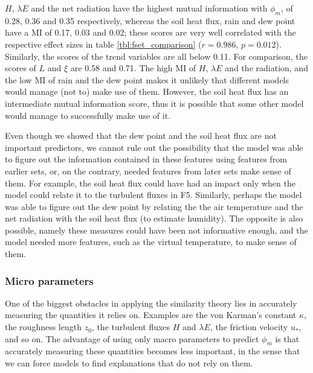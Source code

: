 \documentclass[a4paper,11pt]{kth-mag}
\begin{document}
$H$, $\lambda E$ and the net radiation have the highest mutual information with $\phi_m$, of 0.28, 0.36 and 0.35 respectively, whereas the soil heat flux, rain and dew point have a MI of 0.17, 0.03 and 0.02; these scores are very well correlated with the respective effect sizes in table \ref{tbl:fset_comparison} ($r=0.986$, $p=0.012$). Similarly, the scores of the trend variables are all below 0.11. For comparison, the scores of $L$ and $\xi$ are 0.58 and 0.71. The high MI of $H$, $\lambda E$ and the radiation, and the low MI of rain and the dew point makes it unlikely that different models would manage (not to) make use of them. However, the soil heat flux has an intermediate mutual information score, thus it is possible that some other model would manage to successfully make use of it.

Even though we showed that the dew point and the soil heat flux are not important predictors, we cannot rule out the possibility that the model was able to figure out the information contained in these features using features from earlier sets, or, on the contrary, needed features from later sets make sense of them. For example, the soil heat flux could have had an impact only when the model could relate it to the turbulent fluxes in F5. Similarly, perhaps the model was able to figure out the dew point by relating the the air temperature and the net radiation with the soil heat flux (to estimate humidity). The opposite is also possible, namely these measures could have been not informative enough, and the model needed more features, such as the virtual temperature, to make sense of them.

\subsubsection{Micro parameters} One of the biggest obstacles in applying the similarity theory lies in accurately measuring the quantities it relies on. Examples are the von Karman's constant $\kappa$, the roughness length $z_0$, the turbulent fluxes $H$ and $\lambda E$, the friction velocity $u_*$, and so on. The advantage of using only macro parameters to predict $\phi_m$ is that accurately measuring these quantities becomes less important, in the sense that we can force models to find explanations that do not rely on them.
\end{document}
